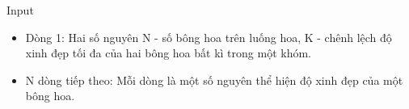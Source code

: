Input  
\begin{itemize}
	\item     Dòng 1: Hai số nguyên N - số bông hoa trên luống hoa, K - chênh lệch độ xinh đẹp tối đa của hai bông hoa bất kì trong một khóm.   
	\item     N dòng tiếp theo: Mỗi dòng là một số nguyên thể hiện độ xinh đẹp của một bông hoa.   
\end{itemize}
